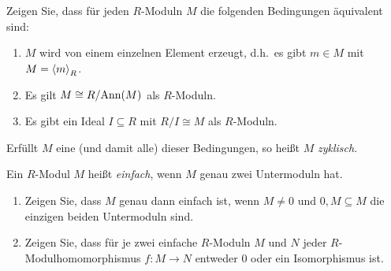 

\begin{question}
  Zeigen Sie, dass für jeden $R$-Moduln $M$ die folgenden Bedingungen äquivalent sind:
  \begin{enumerate}
    \item
      $M$ wird von einem einzelnen Element erzeugt, d.h.\ es gibt $m \in M$ mit $M = \left\langle m \right\rangle_R$.
    \item
      Es gilt $M \cong R/\!\operatorname{Ann}(M)$ als $R$-Moduln.
    \item
      Es gibt ein Ideal $I \subseteq R$ mit $R/I \cong M$ als $R$-Moduln.
  \end{enumerate}
  Erfüllt $M$ eine (und damit alle) dieser Bedingungen, so heißt $M$ \emph{zyklisch}.
\end{question}




\begin{question}
  Ein $R$-Modul $M$ heißt \emph{einfach}, wenn $M$ genau zwei Untermoduln hat.
  \begin{enumerate}
    \item
      Zeigen Sie, dass $M$ genau dann einfach ist, wenn $M \neq 0$ und $0, M \subseteq M$ die einzigen beiden Untermoduln sind.
    \item
      Zeigen Sie, dass für je zwei einfache $R$-Moduln $M$ und $N$ jeder $R$-Mo\-dul\-ho\-mo\-mor\-phis\-mus $f \colon M \to N$ entweder $0$ oder ein Isomorphismus ist.
  \end{enumerate}
\end{question}




